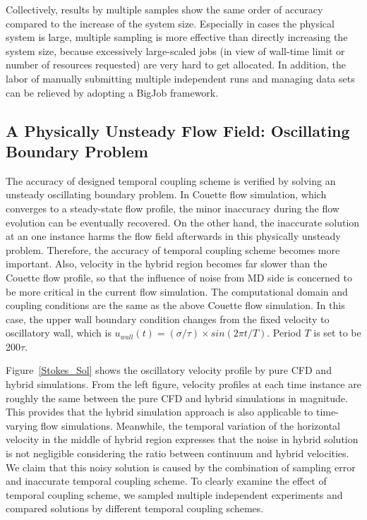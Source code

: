 \documentclass[preprint,12pt]{elsarticle}
\begin{document}
Collectively, results by multiple samples show the same order of accuracy compared to the increase of the system size. Especially in cases the physical system is large, multiple sampling is more effective than directly increasing the system size, because excessively large-scaled jobs (in view of wall-time limit or number of resources requested) are very hard to get allocated. In addition, the labor of manually submitting multiple independent runs and managing data sets can be relieved by adopting a BigJob framework.


\subsection{A Physically Unsteady Flow Field: Oscillating Boundary Problem}
\label{sec:accuracy_oscillation}

The accuracy of designed temporal coupling scheme is verified by solving an unsteady oscillating boundary problem. In Couette flow simulation, which converges to a steady-state flow profile, the minor inaccuracy during the flow evolution can be eventually recovered. On the other hand, the inaccurate solution at an one instance harms the flow field afterwards in this physically unsteady problem. Therefore, the accuracy of temporal coupling scheme becomes more important. Also, velocity in the hybrid region becomes far slower than the Couette flow profile, so that the influence of noise from MD side is concerned to be more critical in the current flow simulation. The computational domain and coupling conditions are the same as the above Couette flow simulation. In this case, the upper wall boundary condition changes from the fixed velocity to oscillatory wall, which is $u_{wall}(t)=({\sigma}/{\tau}){\times}sin(2{\pi}t/T)$. Period $T$ is set to be 200$\tau$.


Figure~\ref{Stokes_Sol} shows the oscillatory velocity profile by pure CFD and hybrid simulations. From the left figure, velocity profiles at each time instance are roughly the same between the pure CFD and hybrid simulations in magnitude. This provides that the hybrid simulation approach is also applicable to time-varying flow simulations. Meanwhile, the temporal variation of the horizontal velocity in the middle of hybrid region expresses that the noise in hybrid solution is not negligible considering the ratio between continuum and hybrid velocities. We claim that this noisy solution is caused by the combination of sampling error and inaccurate temporal coupling scheme. To clearly examine the effect of temporal coupling scheme, we sampled multiple independent experiments and compared solutions by different temporal coupling schemes.
\end{document}
